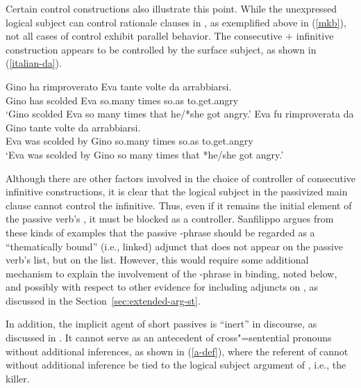 \documentclass[output=paper
 	        ,biblatex
                ,babelshorthands
                ,newtxmath
                ,draftmode
                ,colorlinks, citecolor=brown
]{langscibook}
\begin{document}
Certain control constructions also illustrate this point.
While the unexpressed logical subject can control rationale clauses in , as exemplified above in (\ref{mkb}), not all cases of control exhibit parallel behavior.
The  consecutive  + infinitive construction \citep{Perlmutter1984, Sanfilippo1998} appears to be controlled by the surface subject, as shown in (\ref{italian-da}).


\begin{exe}
\ex     \label{italian-da}
\begin{xlist}
\ex
\gll Gino ha  rimproverato Eva tante   volte da    arrabbiarsi.  \\
     Gino has scolded      Eva so.many times so.as to.get.angry  \\
\glt `Gino scolded Eva so many times that he/*she got angry.'
\ex
\gll Eva fu  rimproverata da Gino tante   volte da    arrabbiarsi.  \\
     Eva was scolded      by Gino so.many times so.as to.get.angry  \\
\glt `Eva was scolded by Gino so many times that *he/she got angry.'
\end{xlist}
\end{exe}

Although there are other factors involved in the choice of controller of consecutive  infinitive constructions, it is clear that the logical subject in the passivized main clause cannot control the infinitive.
Thus, even if it remains the initial element of the passive verb's \argst, it must be blocked as a controller.
Sanfilippo argues from these kinds of examples that the passive -phrase should be regarded as a ``thematically bound'' (i.e., linked) adjunct that does
not appear on the passive verb's \argst list, but on the  list.
However, this would require some additional mechanism to explain the involvement of the -phrase in binding, noted below, and possibly with respect to other evidence for including adjuncts on \argst, as discussed in the Section~\ref{sec:extended-arg-st}.

In addition, the implicit agent of short passives is ``inert'' in discourse, as discussed in \citet{KoenigandMauner1999}.
It cannot serve as an antecedent of cross"=sentential pronouns without additional inferences, as shown in (\ref{a-def}), where the referent of  cannot without additional inference be tied to the logical subject argument of , i.e., the killer.
\end{document}
